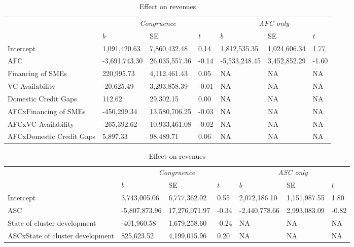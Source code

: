\documentclass[
  english,
  man]{apa6}
\begin{document}
\begin{table}

\caption{\label{tab:unnamed-chunk-24}Effect on revenues}
\centering
\fontsize{7}{9}\selectfont
\begin{tabular}[t]{l|l|l|l|l|l|l}
\hline
\multicolumn{1}{c|}{\em{ }} & \multicolumn{3}{c|}{\em{Congruence}} & \multicolumn{3}{c}{\em{AFC only}} \\
\cline{2-4} \cline{5-7}
  & $b$ & SE & $t$ & $b$ & SE & $t$\\
\hline
Intercept & 1,091,420.63 & 7,860,432.48 & 0.14 & 1,812,535.35 & 1,024,606.34 & 1.77\\
\hline
AFC & -3,691,743.30 & 26,035,557.36 & -0.14 & -5,533,248.45 & 3,452,852.29 & -1.60\\
\hline
Financing of SMEs & 220,995.73 & 4,112,461.43 & 0.05 & NA & NA & NA\\
\hline
VC Availability & -20,625.49 & 3,293,858.39 & -0.01 & NA & NA & NA\\
\hline
Domestic Credit Gaps & 112.62 & 29,302.15 & 0.00 & NA & NA & NA\\
\hline
AFCxFinancing of SMEs & -450,299.34 & 13,580,706.25 & -0.03 & NA & NA & NA\\
\hline
AFCxVC Availability & -265,392.62 & 10,933,461.08 & -0.02 & NA & NA & NA\\
\hline
AFCxDomestic Credit Gaps & 5,897.33 & 98,489.71 & 0.06 & NA & NA & NA\\
\hline
\end{tabular}
\end{table}

\begin{table}

\caption{\label{tab:unnamed-chunk-24}Effect on revenues}
\centering
\fontsize{7}{9}\selectfont
\begin{tabular}[t]{l|l|l|l|l|l|l}
\hline
\multicolumn{1}{c|}{\em{ }} & \multicolumn{3}{c|}{\em{Congruence}} & \multicolumn{3}{c}{\em{ASC only}} \\
\cline{2-4} \cline{5-7}
  & $b$ & SE & $t$ & $b$ & SE & $t$\\
\hline
Intercept & 3,743,005.06 & 6,777,362.02 & 0.55 & 2,072,186.10 & 1,151,987.55 & 1.80\\
\hline
ASC & -5,807,873.96 & 17,276,071.97 & -0.34 & -2,440,778.66 & 2,993,083.09 & -0.82\\
\hline
State of cluster development & -401,960.58 & 1,679,258.60 & -0.24 & NA & NA & NA\\
\hline
ASCxState of cluster development & 825,623.52 & 4,199,015.96 & 0.20 & NA & NA & NA\\
\hline
\end{tabular}
\end{table}
\end{document}
